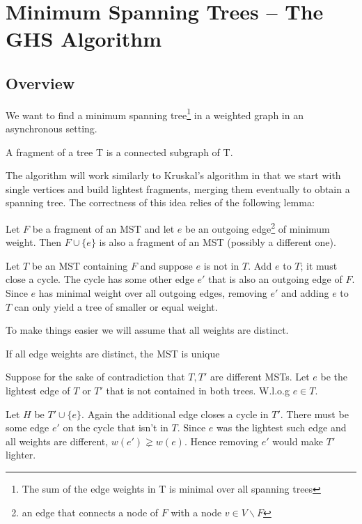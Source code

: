 \section{Minimum Spanning Trees -- The GHS Algorithm}
\subsection{Overview}

We want to find a minimum spanning tree\footnote{The sum of the edge weights in T is minimal over all spanning trees} in a weighted graph in an asynchronous setting. 

\begin{Def}[Fragment] A fragment of a tree T is a connected subgraph of T. \end{Def}

The algorithm will work similarly to Kruskal's algorithm in that we start with single vertices and build lightest fragments, merging them eventually to obtain a spanning tree. The correctness of this idea relies of the following lemma:

\begin{lem} Let $F$ be a fragment of an MST and let $e$ be an outgoing edge\footnote{an edge that connects a node of $F$ with a node $v\in V\backslash F$} of minimum weight. Then $F\cup \{e\}$ is also a fragment of an MST (possibly a different one).\end{lem}

\begin{pr} Let $T$ be an MST containing $F$ and suppose $e$ is not in $T$. Add $e$ to $T$; it must close a cycle. The cycle has some other edge $e'$ that is also an outgoing edge of $F$. Since $e$ has minimal weight over all outgoing edges, removing $e'$ and adding $e$ to $T$ can only yield a tree of smaller or equal weight.\end{pr}

To make things easier we will assume that all weights are distinct.

\begin{lem} If all edge weights are distinct, the MST is unique \end{lem}
\begin{pr} Suppose for the sake of contradiction that $T,T'$ are different MSTs. Let $e$ be the lightest edge of $T$ or $T'$ that is not contained in both trees. W.l.o.g $e\in T$. 

Let $H$ be $T'\cup \{e\}$. Again the additional edge closes a cycle in $T'$. There must be some edge $e'$ on the cycle that isn't in $T$. Since $e$ was the lightest such edge and all weights are different, $w(e')\gneq w(e)$. Hence removing $e'$ would make $T'$ lighter.\end{pr}

